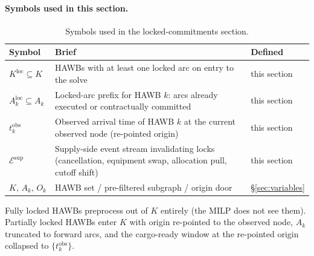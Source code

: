 \documentclass[11pt,a4paper]{article}
\theoremstyle{definition}
\begin{document}
\paragraph{Symbols used in this section.}
\begin{table}[H]
\centering
\caption{Symbols used in the locked-commitments section.}
\label{tab:locked-syms}
\begin{tabular}{lp{9cm}p{3.5cm}}
\toprule
Symbol & Brief & Defined \\
\midrule
$K^{\text{loc}} \subseteq K$ & HAWBs with at least one locked arc on entry to the solve & this section \\
$A_k^{\text{loc}} \subseteq A_k$ & Locked-arc prefix for HAWB $k$: arcs already executed or contractually committed & this section \\
$t_k^{\text{obs}}$ & Observed arrival time of HAWB $k$ at the current observed node (re-pointed origin) & this section \\
$\mathcal{E}^{\text{sup}}$ & Supply-side event stream invalidating locks (cancellation, equipment swap, allocation pull, cutoff shift) & this section \\
$K,\, A_k,\, O_k$ & HAWB set / pre-filtered subgraph / origin door & \S\ref{sec:variables} \\
\bottomrule
\end{tabular}
\end{table}
Fully locked HAWBs preprocess out of $K$ entirely (the MILP does not see
them). Partially locked HAWBs enter $K$ with origin re-pointed to the
observed node, $A_k$ truncated to forward arcs, and the cargo-ready window
at the re-pointed origin collapsed to $\{t_k^{\text{obs}}\}$.
\end{document}
